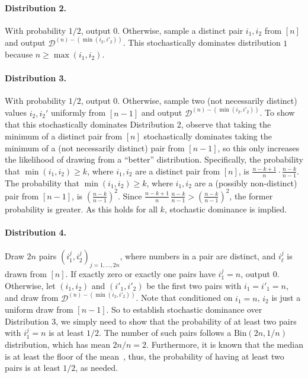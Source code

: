    \paragraph{Distribution 2.} With probability $1/2$, output $0$. Otherwise, sample a distinct pair $i_1, i_2$ from $[n]$ and output $\mathcal{D}^{(n) - (\min(i_2, i'_2))}$. This stochastically dominates distribution $1$ because $n \ge \max(i_1, i_2)$.

    \paragraph{Distribution 3.} With probability $1/2$, output $0$. Otherwise, sample two (not necessarily distinct) values $i_2, i_2'$ uniformly from $[n-1]$ and output $\mathcal{D}^{(n) - (\min(i_2, i'_2))}$. To show that this stochastically dominates Distribution 2,  observe that taking the minimum of a distinct pair from $[n]$ stochastically dominates taking the minimum of a (not necessarily distinct) pair from $[n - 1]$, so this only increases the likelihood of drawing from a ``better'' distribution. Specifically, the probability that $\min(i_1, i_2) \ge k$, where $i_1, i_2$ are a distinct pair from $[n]$,  is $\frac{n - k + 1}{n} \cdot \frac{n - k}{n - 1}$. The probability that $\min(i_1, i_2) \ge k$, where $i_1, i_2$ are a (possibly non-distinct) pair from $[n-1]$, is $\left(\frac{n - k}{n - 1}\right)^2$. Since $\frac{n - k + 1}{n} \, \frac{n - k}{n - 1} > \left( \frac{n - k}{n - 1} \right)^2$, the former probability is greater. As this holds for all $k$, stochastic dominance is implied.

    \paragraph{Distribution 4.} Draw $2n$ pairs $(i^j_1, i^j_2)_{j = 1, \ldots, 2n}$, where numbers in a pair are distinct, and $i^j_{\ell}$ is drawn from $[n]$. If exactly zero or exactly one pairs have $i^j_1 = n$, output $0$. Otherwise, let  $(i_1, i_2)$ and $(i'_1, i'_2)$ be the first two pairs with $i_1 = i'_1 = n$, and draw from $\mathcal{D}^{(n) - (\min(i_2, i'_2))}$. Note that conditioned on $i_1 = n$, $i_2$ is just a uniform draw from $[n - 1]$. So to establish stochastic dominance over Distribution 3, we simply need to show that the probability of at least two pairs with $i^j_1 = n$ is at least $1/2$. The number of such pairs follows a $\text{Bin}(2n, 1/n)$ distribution, which has mean $2n/n = 2$. Furthermore, it is known that the median is at least the floor of the mean~\cite{kaas1980mean}, thus, the probability of having at least two pairs is at least $1/2$, as needed.

